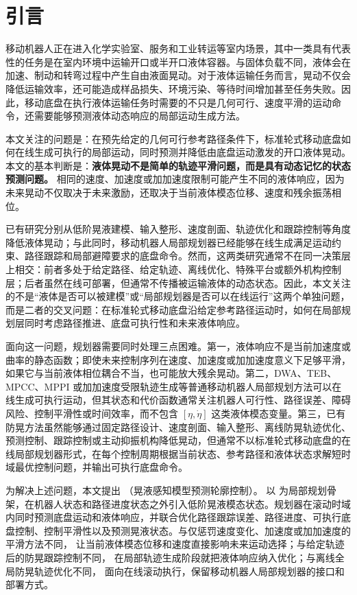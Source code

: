 \section{引言}

移动机器人正在进入化学实验室、服务和工业转运等室内场景，其中一类具有代表性的任务是在室内环境中运输开口或半开口液体容器。与固体负载不同，液体会在加速、制动和转弯过程中产生自由液面晃动。对于液体运输任务而言，晃动不仅会降低运输效率，还可能造成样品损失、环境污染、等待时间增加甚至任务失败。因此，移动底盘在执行液体运输任务时需要的不只是几何可行、速度平滑的运动命令，还需要能够预测液体动态响应的局部运动生成方法。

本文关注的问题是：在预先给定的几何可行参考路径条件下，标准轮式移动底盘如何在线生成可执行的局部运动，同时预测并降低由底盘运动激发的开口液体晃动。本文的基本判断是：\textbf{液体晃动不是简单的轨迹平滑问题，而是具有动态记忆的状态预测问题。} 相同的速度、加速度或加加速度限制可能产生不同的液体响应，因为未来晃动不仅取决于未来激励，还取决于当前液体模态位移、速度和残余振荡相位。

已有研究分别从低阶晃液建模、输入整形、速度剖面、轨迹优化和跟踪控制等角度降低液体晃动\cite{A02_Guagliumi2021,A01_Leva2021,A07_Singer1990,A12_Okatsuka2011,C05_Okatsuka2012}；与此同时，移动机器人局部规划器已经能够在线生成满足运动约束、路径跟踪和局部避障要求的底盘命令\cite{D15_Fox1997,D16_Rosmann2017,D17_Rosmann2021,D19_Liniger2015,D20_Brito2019}。然而，这两类研究通常不在同一决策层上相交：前者多处于给定路径、给定轨迹、离线优化、特殊平台或额外机构控制层；后者虽然在线可部署，但通常不传播被运输液体的动态状态。因此，本文关注的不是“液体是否可以被建模”或“局部规划器是否可以在线运行”这两个单独问题，而是二者的交叉问题：在标准轮式移动底盘沿给定参考路径运动时，如何在局部规划层同时考虑路径推进、底盘可执行性和未来液体响应。

面向这一问题，规划器需要同时处理三点困难。第一，液体响应不是当前加速度或曲率的静态函数；即使未来控制序列在速度、加速度或加加速度意义下足够平滑，如果它与当前液体相位耦合不当，也可能放大残余晃动。第二，DWA、TEB、MPCC、MPPI 或加加速度受限轨迹生成等普通移动机器人局部规划方法可以在线生成可执行运动，但其状态和代价函数通常关注机器人可行性、路径误差、障碍风险、控制平滑性或时间效率，而不包含 $[\eta,\dot{\eta}]$ 这类液体模态变量。第三，已有防晃方法虽然能够通过固定路径设计、速度剖面、输入整形、离线防晃轨迹优化、预测控制、跟踪控制或主动抑振机构降低晃动，但通常不以标准轮式移动底盘的在线局部规划器形式，在每个控制周期根据当前状态、参考路径和液体状态求解短时域最优控制问题，并输出可执行底盘命令。

为解决上述问题，本文提出 \SPMPC{}（晃液感知模型预测轮廓控制）。\SPMPC{} 以 \MPCC{} 为局部规划骨架，在机器人状态和路径进度状态之外引入低阶晃液模态状态。规划器在滚动时域内同时预测底盘运动和液体响应，并联合优化路径跟踪误差、路径进度、可执行底盘控制、控制平滑性以及预测晃液状态。与仅惩罚速度变化、加速度或加加速度的平滑方法不同，\SPMPC{} 让当前液体模态位移和速度直接影响未来运动选择；与给定轨迹后的防晃跟踪控制不同，\SPMPC{} 在局部轨迹生成阶段就把液体响应纳入优化；与离线全局防晃轨迹优化不同，\SPMPC{} 面向在线滚动执行，保留移动机器人局部规划器的接口和部署方式。

